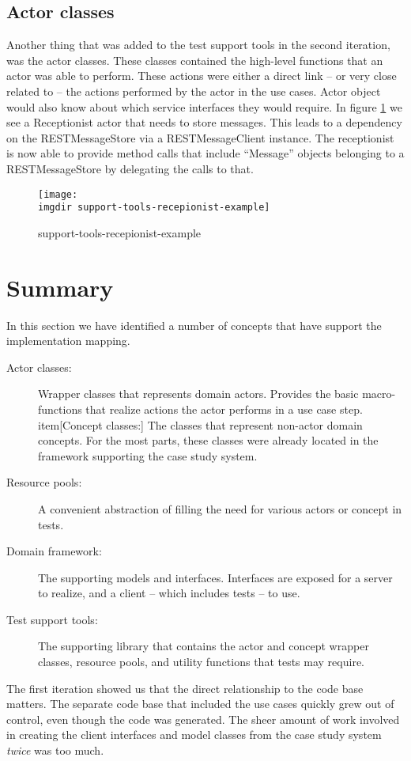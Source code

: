 \subsection{Actor classes}
Another thing that was added to the test support tools in the second iteration, was the actor classes. These classes contained the high-level functions that an actor was able to perform. These actions were either a direct link -- or very close related to -- the actions performed by the actor in the use cases. Actor object would also know about which service interfaces they would require. In figure \ref{fig:support-tools-recepionist-example} we see a Receptionist actor that needs to store messages. This leads to a dependency on the RESTMessageStore via a RESTMessageClient instance. The receptionist is now able to provide method calls that include ``Message'' objects belonging to a RESTMessageStore by delegating the calls to that.
\begin{figure}[!htbp]
 \centering
 \texttt{[image: \\imgdir support-tools-recepionist-example]}
 \caption{support-tools-recepionist-example}
 \label{fig:support-tools-recepionist-example}
\end{figure}

\section{Summary}
In this section we have identified a number of concepts that have support the implementation mapping.
\begin{description}
  \item[Actor classes:] Wrapper classes that represents domain actors. Provides the basic macro-functions that realize actions the actor performs in a use case step.
   item[Concept classes:] The classes that represent non-actor domain concepts. For the most parts, these classes were already located in the framework supporting the case study system.
  \item[Resource pools:] A convenient abstraction of filling the need for various actors or concept in tests.
  \item[Domain framework:] The supporting models and interfaces. Interfaces are exposed for a server to realize, and a client -- which includes tests -- to use.
  \item[Test support tools:] The supporting library that contains the actor and concept wrapper classes, resource pools, and utility functions that tests may require.
\end{description}
The first iteration showed us that the direct relationship to the code base matters. The separate code base that included the use cases quickly grew out of control, even though the code was generated. The sheer amount of work involved in creating the client interfaces and model classes from the case study system \emph{twice} was too much.\medskip

